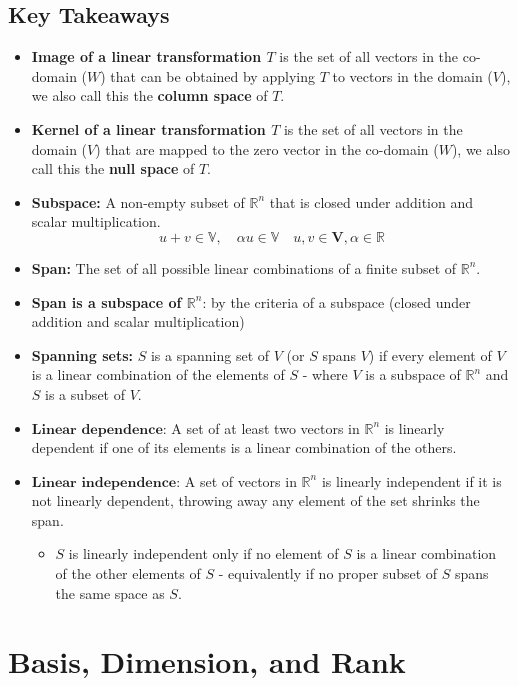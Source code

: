 \documentclass[a4paper, 9pt]{extarticle}
\begin{document}
\subsection{Key Takeaways}
\begin{takeaway-box}{}{}
\begin{itemize}
  \item \textbf{Image of a linear transformation $T$} is the set of all vectors in the co-domain ($W$) that can be obtained by applying $T$ to vectors in the domain ($V$), we also call this the \textbf{column space} of $T$.
  \item \textbf{Kernel of a linear transformation $T$} is the set of all vectors in the domain ($V$) that are mapped to the zero vector in the co-domain ($W$), we also call this the \textbf{null space} of $T$.
  \item \textbf{Subspace:} A non-empty subset of $\mathbb{R}^n$ that is closed under addition and scalar multiplication.
        $$u +v \in \mathbb{V}, \quad \alpha u \in \mathbb{V} \quad u, v \in \textbf{V}, \alpha \in \mathbb{R} $$
  \item \textbf{Span:} The set of all possible linear combinations of a finite subset of $\mathbb{R}^n$.
  \item \textbf{Span is a subspace of $\mathbb{R}^n$}: by the criteria of a subspace (closed under addition and scalar multiplication)
  \item \textbf{Spanning sets:} $S$ is a spanning set of $V$  (or $S$ spans $V$) if every element of $V$ is a linear combination of the elements of $S$ - where $V$ is a subspace of $\mathbb{R}^n$ and $S$ is a subset of $V$.
  \item $\textbf{Linear dependence}$: A set of at least two vectors in $\mathbb{R}^n$ is linearly dependent if one of its elements is a linear combination of the others.
  \item $\textbf{Linear independence}$: A set of vectors in $\mathbb{R}^n$ is linearly independent if it is not linearly dependent, throwing away any element of the set shrinks the span.
        \begin{itemize}
          \item $S$ is linearly independent only if no element of $S$ is a linear combination of the other elements of $S$ - equivalently if no proper subset of $S$ spans the same space as $S$.
        \end{itemize}
\end{itemize}
\end{takeaway-box}
\section{Basis, Dimension, and Rank}
\end{document}
